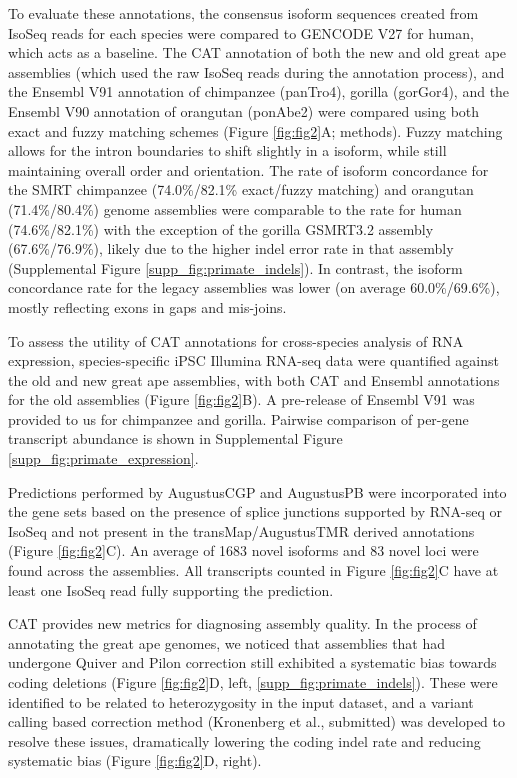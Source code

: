 \documentclass[fleqn,10pt]{wlscirep}
\begin{document}
To evaluate these annotations, the consensus isoform sequences created from IsoSeq reads for each species were compared to GENCODE V27 for human, which acts as a baseline. The CAT annotation of both the new and old great ape assemblies (which used the raw IsoSeq reads during the annotation process), and the Ensembl V91 annotation of chimpanzee (panTro4), gorilla (gorGor4), and the Ensembl V90 annotation of orangutan (ponAbe2) were compared using both exact and fuzzy matching schemes (Figure \ref{fig:fig2}A; methods). Fuzzy matching allows for the intron boundaries to shift slightly in a isoform, while still maintaining overall order and orientation. The rate of isoform concordance for the SMRT chimpanzee (74.0\%/82.1\% exact/fuzzy matching) and orangutan (71.4\%/80.4\%) genome assemblies were comparable to the rate for human (74.6\%/82.1\%) with the exception of the gorilla GSMRT3.2 assembly (67.6\%/76.9\%), likely due to the higher indel error rate in that assembly (Supplemental Figure \ref{supp_fig:primate_indels}). In contrast, the isoform concordance rate for the legacy assemblies was lower (on average 60.0\%/69.6\%), mostly reflecting exons in gaps and mis-joins.

To assess the utility of CAT annotations for cross-species analysis of RNA expression, species-specific iPSC Illumina RNA-seq data were quantified against the old and new great ape assemblies, with both CAT and Ensembl annotations for the old assemblies (Figure \ref{fig:fig2}B). A pre-release of Ensembl V91 was provided to us for chimpanzee and gorilla. Pairwise comparison of per-gene transcript abundance is shown in Supplemental Figure \ref{supp_fig:primate_expression}. 

Predictions performed by AugustusCGP and AugustusPB were incorporated into the gene sets based on the presence of splice junctions supported by RNA-seq or IsoSeq and not present in the transMap/AugustusTMR derived annotations (Figure \ref{fig:fig2}C). An average of 1683 novel isoforms and 83 novel loci were found across the assemblies. All transcripts counted in Figure \ref{fig:fig2}C have at least one IsoSeq read fully supporting the prediction.

CAT provides new metrics for diagnosing assembly quality. In the process of annotating the great ape genomes, we noticed that assemblies that had undergone Quiver and Pilon \cite{walker2014pilon} correction still exhibited a systematic bias towards coding deletions (Figure \ref{fig:fig2}D, left, \ref{supp_fig:primate_indels}). These were identified to be related to heterozygosity in the input dataset, and a variant calling based correction method (Kronenberg et al., submitted) was developed to resolve these issues, dramatically lowering the coding indel rate and reducing systematic bias (Figure \ref{fig:fig2}D, right). 
\end{document}
